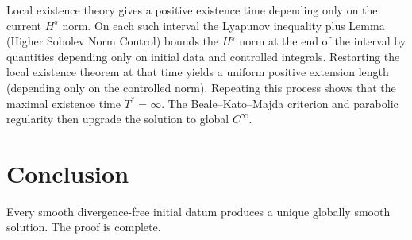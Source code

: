 \documentclass[11pt,a4paper]{article}
\begin{document}
Local existence theory gives a positive existence time depending only on the current \( H^s \) norm. On each such interval the Lyapunov inequality plus Lemma (Higher Sobolev Norm Control) bounds the \( H^s \) norm at the end of the interval by quantities depending only on initial data and controlled integrals. Restarting the local existence theorem at that time yields a uniform positive extension length (depending only on the controlled norm). Repeating this process shows that the maximal existence time \( T^* = \infty \). The Beale--Kato--Majda criterion and parabolic regularity then upgrade the solution to global \( C^\infty \).

\section{Conclusion}

Every smooth divergence-free initial datum produces a unique globally smooth solution. The proof is complete.
\end{document}
